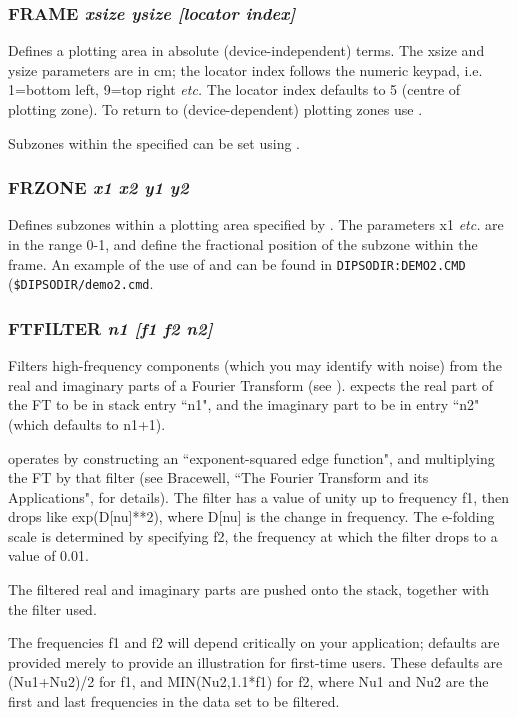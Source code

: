 \documentclass[twoside,11pt,noabs,nolof]{starlink}
\providecommand{\dipcom}[3]{\subsubsection*{\label{COM:#1}\textbf{#1} \emph{#2}}}
\begin{document}
\dipcom{FRAME}{xsize ysize [locator index]}{Sets up a plotting area of a given absolute size}
Defines a plotting area in absolute (device-independent) terms. The
xsize and ysize parameters are in cm; the locator index follows the
numeric keypad, i.e. 1=bottom left, 9=top right \emph{etc.} The
locator index defaults to 5 (centre of plotting zone). To return to
(device-dependent) plotting zones use .

Subzones within the specified   can be set using .

\dipcom{FRZONE}{x1 x2 y1 y2}{Divides a plotting area (set up by {\texttt{FRAME}})  into several sub-frames}
Defines subzones within a plotting area specified by .  The
parameters x1 \emph{etc.} are in the range 0-1, and define the
fractional position of the subzone within the frame. An example of the
use of   and   can be found in {\texttt{DIPSODIR:DEMO2.CMD}}
({\texttt{\$DIPSODIR/demo2.cmd}}.

\dipcom{FTFILTER}{n1 [f1 f2 n2]}{Filters high frequency components from a Fourier transform}
Filters high-frequency components (which you may identify with noise)
from the real and imaginary parts of a Fourier Transform (see ).
  expects the real part of the FT to be in stack entry ``n1",
and the imaginary part to be in entry ``n2" (which defaults to n1+1).

  operates by constructing an ``exponent-squared edge
function", and multiplying the FT by that filter (see Bracewell, ``The
Fourier Transform and its Applications", for details). The filter has
a value of unity up to frequency f1, then drops like exp(D[nu]**2),
where D[nu] is the change in frequency. The e-folding scale is
determined by specifying f2, the frequency at which the filter drops
to a value of 0.01.

The filtered real and imaginary parts are pushed onto the stack,
together with the filter used.

The frequencies f1 and f2 will depend critically on your application;
defaults are provided merely to provide an illustration for first-time
users. These defaults are (Nu1+Nu2)/2 for f1, and MIN(Nu2,1.1*f1) for
f2, where Nu1 and Nu2 are the first and last frequencies in the
data set to be filtered.
\end{document}
